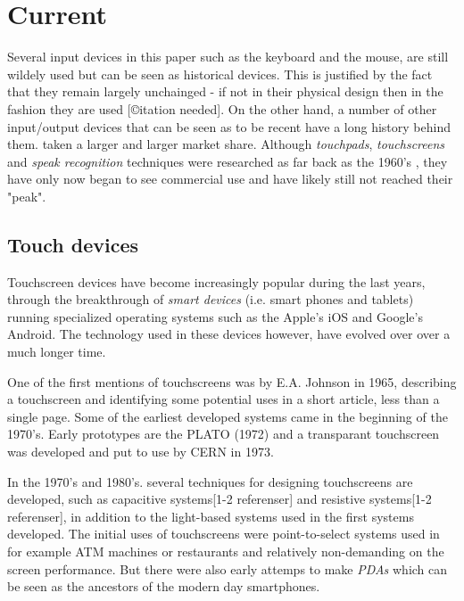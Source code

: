\section{Current}


Several input devices in this paper such as the keyboard and the mouse, are still wildely used but can be seen as historical devices. This is justified by the fact that they remain largely unchainged - if not in their physical design then in the fashion they are used [©itation needed]. On the other hand, a number of other input/output devices that can be seen as to be recent have a long history behind them. taken a larger and larger market share. Although \emph{touchpads}, \emph{touchscreens} and \emph{speak recognition} techniques were researched as far back as the 1960's \cite{buxton}\cite{shoebox}, they have only now began to see commercial use and have likely still not reached their "peak". 


\subsection{Touch devices}
Touchscreen devices have become increasingly popular during the last years, through the breakthrough of \emph{smart devices} (i.e. smart phones and tablets) running specialized operating systems such as the Apple's iOS and Google's Android. The technology used in these devices however, have evolved over over a much longer time.

One of the first mentions of touchscreens was by E.A. Johnson in 1965, describing a touchscreen and identifying some potential uses in a short article, less than a single page\cite{4205802}. Some of the earliest developed systems came in the beginning of the 1970's. Early prototypes are the PLATO \cite{buxton} (1972) and a transparant touchscreen was developed and put to use by CERN in 1973\cite{cern}.


In the 1970's and 1980's. several techniques for designing touchscreens are developed, such as capacitive systems[1-2 referenser] and resistive systems[1-2 referenser], in addition to the light-based systems used in the first systems developed. The initial uses of touchscreens were point-to-select systems used in for example ATM machines or restaurants and relatively non-demanding on the screen performance\cite{buxton}. But there were also early attemps to make \emph{PDAs} which can be seen as the ancestors of the modern day smartphones.	


